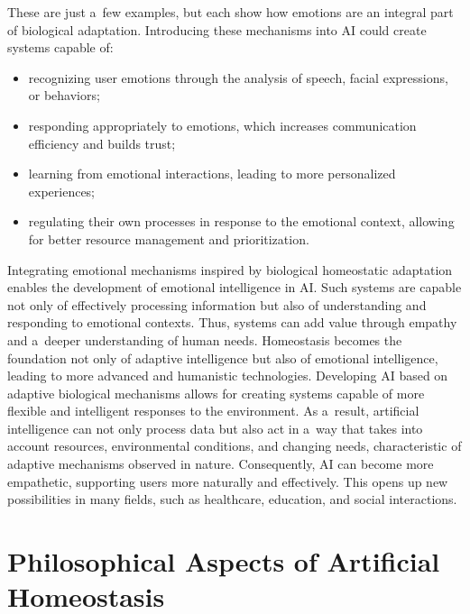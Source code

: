 \documentclass[%
  manuscript=article,
  year=2024,
  volume=77,
  doi=10.59203/zfn.77.706,
]{zfn}
\begin{document}
These are just a~few examples, but each show how emotions are an integral part of biological adaptation. Introducing these mechanisms into AI could create systems capable of:



\begin{itemize}

\item recognizing user emotions through the analysis of speech, facial expressions, or behaviors;~

\item responding appropriately to emotions, which increases communication efficiency and builds trust;~

\item learning from emotional interactions, leading to more personalized experiences;~

\item regulating their own processes in response to the emotional context, allowing for better resource management and prioritization.

\end{itemize}

Integrating emotional mechanisms inspired by biological homeostatic adaptation enables the development of emotional intelligence in AI. Such systems are capable not only of effectively processing information but also of understanding and responding to emotional contexts. Thus, systems can add value through empathy and a~deeper understanding of human needs. Homeostasis becomes the foundation not only of adaptive intelligence but also of emotional intelligence, leading to more advanced and humanistic technologies. Developing AI based on adaptive biological mechanisms allows for creating systems capable of more flexible and intelligent responses to the environment. As a~result, artificial intelligence can not only process data but also act in a~way that takes into account resources, environmental conditions, and changing needs, characteristic of adaptive mechanisms observed in nature. Consequently, AI can become more empathetic, supporting users more naturally and effectively. This opens up new possibilities in many fields, such as healthcare, education, and social interactions.



\section*{Philosophical Aspects of Artificial Homeostasis}
\end{document}
